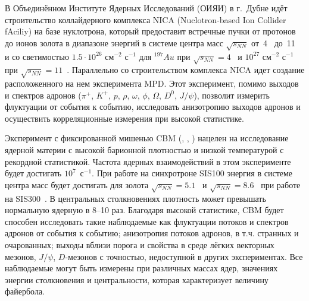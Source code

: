 \bigskip



В Объединённом Институте Ядерных Исследований (ОИЯИ) в г.~Дубне идёт строительство коллайдерного комплекса NICA (Nuclotron-based Ion Collider fAciliy) на базе нуклотрона, который предоставит встречные пучки от протонов до ионов золота в диапазоне энергий в системе центра масс $\sqrt{s_{NN}}$ от~4~\GeVperNucl{} до~11~\GeVperNucl{} и со светимостью $1.5 \cdot 10^{26}$ см$^{-2}$ с$^{-1}$ для $^{197}Au$ при $\sqrt{s_{NN}}=4$~\GeVperNucl{} и $10^{27}$ см$^{-2}$ с$^{-1}$ при $\sqrt{s_{NN}}=11$~\GeVperNucl{}. Параллельно со строительством комплекса NICA идет создание расположенного на нем эксперимента MPD. Этот эксперимент, помимо выходов и спектров адронов ($\pi^{+}$, $K^{+}$, $p$, $\rho$, $\omega$, $\phi$, $\Omega$, $D^{0}$, $J/\psi$), позволит измерить флуктуации от события к событию, исследовать анизотропию выходов адронов и осуществить корреляционные измерения при высокой статистике.

\bigskip



Эксперимент с фиксированной мишенью CBM (\cite{CBMSIS100}, \cite{CBM_TSR}, \cite{ProgressReport2014}) нацелен на исследование ядерной материи с высокой барионной плотностью и низкой температурой с рекордной статистикой. Частота ядерных взаимодействий в этом эксперименте будет достигать $10^7$~с$^{-1}$. При работе на синхротроне SIS100 энергия в системе центра масс будет достигать для золота $\sqrt{s_{NN}}=5.1$~\GeVperNucl{} и $\sqrt{s_{NN}}=8.6$~\GeVperNucl{} при работе на SIS300~\cite{CBMBook}. В центральных столкновениях плотность может превышать нормальную ядерную в 8--10 раз. Благодаря высокой статистике, CBM будет способен исследовать такие наблюдаемые как флуктуации потоков и спектров адронов от события к событию; анизотропия потоков адронов, в т.ч. странных и очарованных; выходы вблизи порога и свойства в среде лёгких векторных мезонов, $J/\psi$, $D$-мезонов с точностью, недоступной в других экспериментах. Все наблюдаемые могут быть измерены при различных массах ядер, значениях энергии столкновения и центральности, которая характеризует величину файербола.

